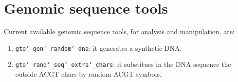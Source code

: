 \chapter{Genomic sequence tools}
\label{gst}

Current available genomic sequence tools, for analysis and manipulation, are:
\begin{enumerate}

\item \texttt{gto\char`_gen\char`_random\char`_dna}: it generates a synthetic DNA.

\item \texttt{gto\char`_rand\char`_seq\char`_extra\char`_chars}: it substitues in the DNA sequence the outside ACGT chars by random ACGT symbols.

\end{enumerate}



